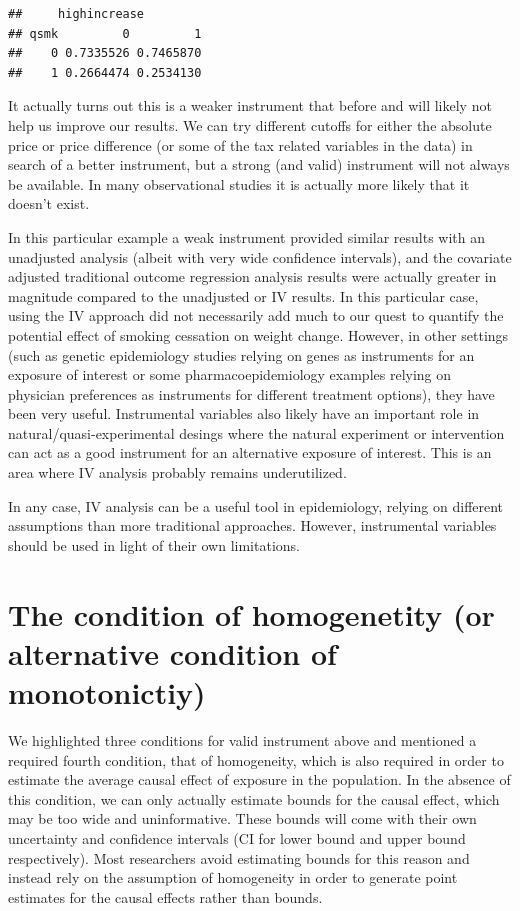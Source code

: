 \documentclass[
]{book}
\begin{document}
\begin{verbatim}
##     highincrease
## qsmk         0         1
##    0 0.7335526 0.7465870
##    1 0.2664474 0.2534130
\end{verbatim}

It actually turns out this is a weaker instrument that before and will likely not help us improve our results. We can try different cutoffs for either the absolute price or price difference (or some of the tax related variables in the data) in search of a better instrument, but a strong (and valid) instrument will not always be available. In many observational studies it is actually more likely that it doesn't exist.

In this particular example a weak instrument provided similar results with an unadjusted analysis (albeit with very wide confidence intervals), and the covariate adjusted traditional outcome regression analysis results were actually greater in magnitude compared to the unadjusted or IV results. In this particular case, using the IV approach did not necessarily add much to our quest to quantify the potential effect of smoking cessation on weight change. However, in other settings (such as genetic epidemiology studies relying on genes as instruments for an exposure of interest or some pharmacoepidemiology examples relying on physician preferences as instruments for different treatment options), they have been very useful. Instrumental variables also likely have an important role in natural/quasi-experimental desings where the natural experiment or intervention can act as a good instrument for an alternative exposure of interest. This is an area where IV analysis probably remains underutilized.

In any case, IV analysis can be a useful tool in epidemiology, relying on different assumptions than more traditional approaches. However, instrumental variables should be used in light of their own limitations.

\hypertarget{the-condition-of-homogenetity-or-alternative-condition-of-monotonictiy}{%
\section{The condition of homogenetity (or alternative condition of monotonictiy)}\label{the-condition-of-homogenetity-or-alternative-condition-of-monotonictiy}}

We highlighted three conditions for valid instrument above and mentioned a required fourth condition, that of homogeneity, which is also required in order to estimate the average causal effect of exposure in the population. In the absence of this condition, we can only actually estimate bounds for the causal effect, which may be too wide and uninformative. These bounds will come with their own uncertainty and confidence intervals (CI for lower bound and upper bound respectively). Most researchers avoid estimating bounds for this reason and instead rely on the assumption of homogeneity in order to generate point estimates for the causal effects rather than bounds.
\end{document}
